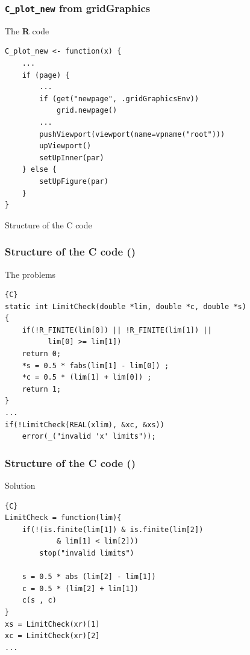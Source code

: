 \documentclass{beamer}
\begin{document}
\begin{frame}[fragile]
\frametitle{\texttt{C\_plot\_new} from \textbf{gridGraphics}}

\begin{block}{The \textbf{R} code}
\begin{lstlisting}
C_plot_new <- function(x) {
    ...
    if (page) {
        ...
        if (get("newpage", .gridGraphicsEnv))
            grid.newpage()
        ...
        pushViewport(viewport(name=vpname("root")))
        upViewport()
        setUpInner(par)
    } else {
        setUpFigure(par)
    }
}
\end{lstlisting}
\end{block}

\end{frame}




\begin{frame}[fragile]
\begin{center}
\Huge Structure of the C code
\end{center}
\end{frame}


\begin{frame}[fragile]
\frametitle{Structure of the \textbf{C} code ()}
\begin{block}{The problems}
\begin{lstlisting}{C}
static int LimitCheck(double *lim, double *c, double *s)
{
    if(!R_FINITE(lim[0]) || !R_FINITE(lim[1]) || 
          lim[0] >= lim[1])
    return 0;
    *s = 0.5 * fabs(lim[1] - lim[0]) ;
    *c = 0.5 * (lim[1] + lim[0]) ;
    return 1;
}
...
if(!LimitCheck(REAL(xlim), &xc, &xs))
	error(_("invalid 'x' limits"));
\end{lstlisting}
\end{block}

\end{frame}



\begin{frame}[fragile]
\frametitle{Structure of the \textbf{C} code ()}
\begin{block}{Solution}
\begin{lstlisting}{C}
LimitCheck = function(lim){
    if(!(is.finite(lim[1]) & is.finite(lim[2]) 
            & lim[1] < lim[2]))
        stop("invalid limits")
      
    s = 0.5 * abs (lim[2] - lim[1])
    c = 0.5 * (lim[2] + lim[1])
    c(s , c)
}
xs = LimitCheck(xr)[1]
xc = LimitCheck(xr)[2]
...
\end{lstlisting}
\end{block}

\end{frame}
\end{document}
